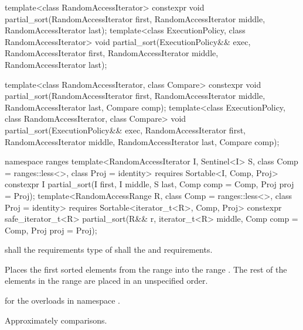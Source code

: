 %
\begin{itemdecl}
template<class RandomAccessIterator>
  constexpr void partial_sort(RandomAccessIterator first,
                              RandomAccessIterator middle,
                              RandomAccessIterator last);
template<class ExecutionPolicy, class RandomAccessIterator>
  void partial_sort(ExecutionPolicy&& exec,
                    RandomAccessIterator first,
                    RandomAccessIterator middle,
                    RandomAccessIterator last);

template<class RandomAccessIterator, class Compare>
  constexpr void partial_sort(RandomAccessIterator first,
                              RandomAccessIterator middle,
                              RandomAccessIterator last,
                              Compare comp);
template<class ExecutionPolicy, class RandomAccessIterator, class Compare>
  void partial_sort(ExecutionPolicy&& exec,
                    RandomAccessIterator first,
                    RandomAccessIterator middle,
                    RandomAccessIterator last,
                    Compare comp);
\end{itemdecl}
\begin{addedblock}
\begin{itemdecl}
namespace ranges {
  template<RandomAccessIterator I, Sentinel<I> S, class Comp = ranges::less<>,
      class Proj = identity>
    requires Sortable<I, Comp, Proj>
    constexpr I
      partial_sort(I first, I middle, S last, Comp comp = Comp{}, Proj proj = Proj{});
  template<RandomAccessRange R, class Comp = ranges::less<>, class Proj = identity>
    requires Sortable<iterator_t<R>, Comp, Proj>
    constexpr safe_iterator_t<R>
      partial_sort(R&& r, iterator_t<R> middle, Comp comp = Comp{},
                   Proj proj = Proj{});
}
\end{itemdecl}
\end{addedblock}

\begin{itemdescr}
\pnum
\requires
{}
 shall  the
requirements  type of  shall  the
 and
 requirements.

\pnum
\effects
Places the first
sorted elements from the range
into the range
.
The rest of the elements in the range
are placed in an unspecified order.
%

\begin{addedblock}
\pnum
\returns {} for the overloads in namespace .
\end{addedblock}

\pnum
\complexity
Approximately
comparisons.
\end{itemdescr}


